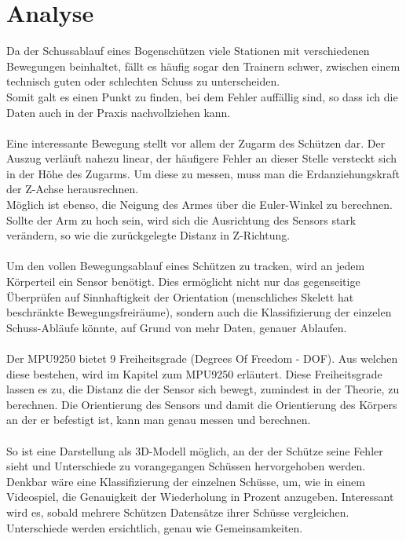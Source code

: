 \section{Analyse}
Da der Schussablauf eines Bogenschützen viele Stationen mit verschiedenen Bewegungen 
beinhaltet, fällt es häufig sogar den Trainern schwer, zwischen einem technisch guten
oder schlechten Schuss zu unterscheiden.\\ 
Somit galt es einen Punkt zu finden, bei dem Fehler auffällig sind, so dass ich die Daten auch in 
der Praxis nachvollziehen kann.\\
\\
Eine interessante Bewegung stellt vor allem der Zugarm des 
Schützen dar. Der Auszug verläuft nahezu linear, der häufigere Fehler 
an dieser Stelle versteckt sich in der Höhe des Zugarms. 
Um diese zu messen, muss man die Erdanziehungskraft der Z-Achse herausrechnen.\\
Möglich ist ebenso, die Neigung des Armes über die Euler-Winkel zu berechnen. Sollte 
der Arm zu hoch sein, wird sich die Ausrichtung des Sensors stark verändern, so wie 
die zurückgelegte Distanz in Z-Richtung.\\
\\
Um den vollen Bewegungsablauf eines Schützen zu tracken, wird an jedem Körperteil ein Sensor
benötigt. Dies ermöglicht nicht nur das gegenseitige Überprüfen auf Sinnhaftigkeit der Orientation
(menschliches Skelett hat beschränkte Bewegungsfreiräume), sondern auch die Klassifizierung der 
einzelen Schuss-Abläufe könnte, auf Grund von mehr Daten, genauer Ablaufen.\\ 
\\
Der MPU9250 bietet 9 Freiheitsgrade (Degrees Of Freedom - DOF). Aus welchen diese bestehen, wird
im Kapitel zum MPU9250 erläutert. Diese Freiheitsgrade lassen es zu, die Distanz 
die der Sensor sich bewegt, zumindest in der Theorie, zu berechnen. Die Orientierung des Sensors 
und damit die Orientierung des Körpers an der er befestigt ist, kann man genau messen und berechnen. \\
\\
So ist eine Darstellung als 3D-Modell möglich, an der der Schütze seine Fehler sieht und Unterschiede
zu vorangegangen Schüssen hervorgehoben werden. \\
Denkbar wäre eine Klassifizierung der einzelnen Schüsse, um, wie in einem Videospiel, die Genauigkeit
der Wiederholung in Prozent anzugeben. Interessant wird es, sobald mehrere Schützen Datensätze
ihrer Schüsse vergleichen. Unterschiede werden ersichtlich, genau wie Gemeinsamkeiten. \\
\\

